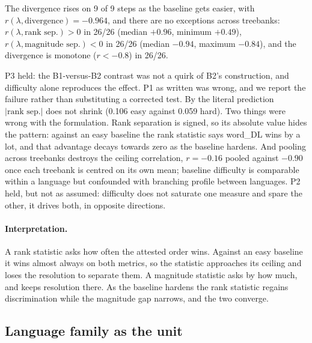 \documentclass[11pt]{article}
\begin{document}
The divergence rises on 9 of 9 steps as the baseline gets easier, with $r(\lambda,\text{divergence})=-0.964$, and there are no exceptions across treebanks: $r(\lambda,\text{rank sep.})>0$ in 26/26 (median $+0.96$, minimum $+0.49$), $r(\lambda,\text{magnitude sep.})<0$ in 26/26 (median $-0.94$, maximum $-0.84$), and the divergence is monotone ($r<-0.8$) in 26/26.

P3 held: the B1-versus-B2 contrast was not a quirk of B2's construction, and difficulty alone reproduces the effect. P1 as written was wrong, and we report the failure rather than substituting a corrected test. By the literal prediction $|\text{rank sep.}|$ does not shrink (0.106 easy against 0.059 hard). Two things were wrong with the formulation. Rank separation is signed, so its absolute value hides the pattern: against an easy baseline the rank statistic says word\_DL wins by a lot, and that advantage decays towards zero as the baseline hardens. And pooling across treebanks destroys the ceiling correlation, $r=-0.16$ pooled against $-0.90$ once each treebank is centred on its own mean; baseline difficulty is comparable within a language but confounded with branching profile between languages. P2 held, but not as assumed: difficulty does not saturate one measure and spare the other, it drives both, in opposite directions.

\paragraph{Interpretation.} A rank statistic asks how often the attested order wins. Against an easy baseline it wins almost always on both metrics, so the statistic approaches its ceiling and loses the resolution to separate them. A magnitude statistic asks by how much, and keeps resolution there. As the baseline hardens the rank statistic regains discrimination while the magnitude gap narrows, and the two converge.

\subsection{Language family as the unit}
\label{sec:family}
\end{document}
